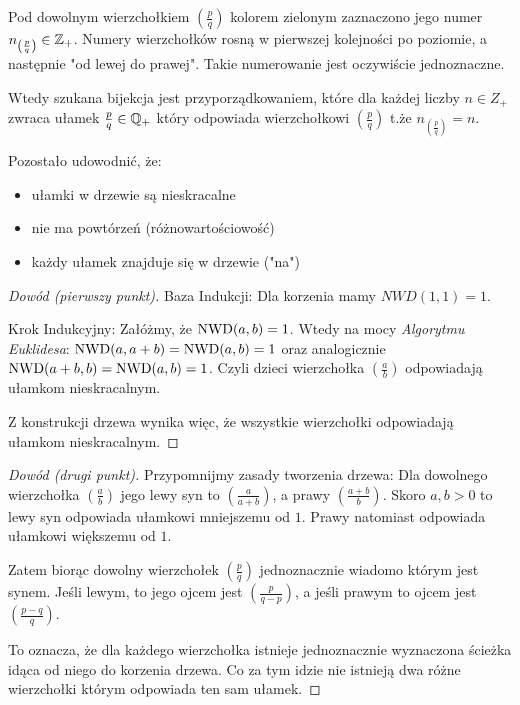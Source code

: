 Pod dowolnym wierzchołkiem $\left(\frac{p}{q}\right)$ kolorem
\textcolor{maincolor}{zielonym}
zaznaczono jego numer $n_{\left(\frac{p}{q}\right)} \in \mathbb{Z}_+$.
Numery wierzchołków rosną w pierwszej kolejności po poziomie, a
następnie "od lewej do prawej". Takie numerowanie jest oczywiście
jednoznaczne.

Wtedy szukana bijekcja jest przyporządkowaniem, które
dla każdej liczby $n \in Z_+$ zwraca ułamek $\frac{p}{q} \in \mathbb{Q}_+$
który odpowiada wierzchołkowi $\left(\frac{p}{q}\right)$ t.że
$n_{\left(\frac{p}{q}\right)} = n$.

Pozostało udowodnić, że:
\begin{itemize}
    \item ułamki w drzewie są nieskracalne
    \item nie ma powtórzeń (różnowartościowość)
    \item każdy ułamek znajduje się w drzewie ("na")
\end{itemize}

\begin{proof}[Dowód (pierwszy punkt)]
Baza Indukcji: Dla korzenia mamy $NWD(1, 1) = 1$.

Krok Indukcyjny: Załóżmy, że $\mathrm{NWD}(a, b) = 1$.
Wtedy na mocy \textit{Algorytmu Euklidesa}:
$\mathrm{NWD}(a, a+b) = \mathrm{NWD}(a, b) = 1$
oraz analogicznie
$\mathrm{NWD}(a+b, b) = \mathrm{NWD}(a, b) = 1$.
Czyli dzieci wierzchołka $\left(\frac{a}{b}\right)$
odpowiadają ułamkom nieskracalnym.

Z konstrukcji drzewa wynika więc,
że wszystkie wierzchołki odpowiadają ułamkom nieskracalnym.
\end{proof}

\begin{proof}[Dowód (drugi punkt)]
Przypomnijmy zasady tworzenia drzewa:
Dla dowolnego wierzchołka $\left(\frac{a}{b}\right)$ jego
lewy syn to $\left(\frac{a}{a+b}\right)$, a prawy $\left(\frac{a+b}{b}\right)$.
Skoro $a, b > 0$ to lewy syn odpowiada ułamkowi mniejszemu
od $1$. Prawy natomiast odpowiada ułamkowi większemu od $1$.

Zatem biorąc dowolny wierzchołek $\left(\frac{p}{q}\right)$
jednoznacznie wiadomo którym jest synem.
Jeśli lewym, to jego ojcem jest $\left(\frac{p}{q-p}\right)$,
a jeśli prawym to ojcem jest $\left(\frac{p-q}{q}\right)$.

To oznacza, że dla każdego wierzchołka istnieje jednoznacznie
wyznaczona ścieżka idąca od niego do korzenia drzewa. Co za tym
idzie nie istnieją dwa różne wierzchołki którym odpowiada ten
sam ułamek.
\end{proof}

